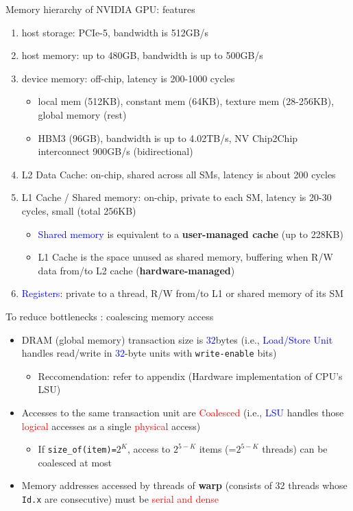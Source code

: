 \documentclass[dvipdfmx, 11pt, aspectratio=169]{beamer}   %
\begin{document}
\begin{frame}{Memory hierarchy of NVIDIA GPU: features}
  \begin{enumerate}
    \item host storage: PCIe-5, bandwidth is 512GB/s
    \item host memory: up to 480GB, bandwidth is up to 500GB/s
    \item device memory: off-chip, latency is 200-1000 cycles
    \begin{itemize}
      \item local mem (512KB), constant mem (64KB), texture mem (28-256KB), global memory (rest)
      \item HBM3 (96GB), bandwidth is  up to 4.02TB/s, NV Chip2Chip interconnect 900GB/s (bidirectional)
    \end{itemize}
    \item L2 Data Cache: on-chip, shared across all SMs, latency is about 200 cycles
    \item L1 Cache / Shared memory: on-chip, private to each SM, latency is 20-30 cycles, small (total 256KB)
    \begin{itemize}
      \item \textcolor{blue}{Shared memory} is equivalent to a \textbf{user-managed cache} (up to 228KB)
      \item L1 Cache is the space unused as shared memory, buffering when R/W data from/to L2 cache (\textbf{hardware-managed})
    \end{itemize}
    \item \textcolor{blue}{Registers}: private to a thread, R/W from/to L1 or shared memory of its SM
  \end{enumerate}
\end{frame}
\begin{frame}[fragile]{To reduce bottlenecks : coalescing memory access}
  \begin{itemize}
    \item DRAM (global memory) transaction size is \textcolor{blue}{$32$}bytes (i.e., \textcolor{blue}{Load/Store Unit} handles read/write in \textcolor{blue}{$32$}-byte units with \lstinline|write-enable| bits)
    \begin{itemize}
      \item Reccomendation: refer to appendix (Hardware implementation of CPU's LSU)
    \end{itemize}
    \item Accesses to the same transaction unit  are \textcolor{red}{Coalesced} (i.e., \textcolor{blue}{LSU} handles those \textcolor{red}{logical} accesses as a single \textcolor{red}{physical} access)
    \begin{itemize}
      \item If \lstinline|size_of(item)=|$2^{K}$, access to $2^{5-K}$ items (=$2^{5-K}$ threads) can be coalesced at most
    \end{itemize}
    \item Memory addresses accessed by threads of \textbf{warp} (consists of 32 threads whose \lstinline|Id.x| are consecutive) must be \textcolor{red}{serial and dense}
  \end{itemize}
\end{frame}
\end{document}

